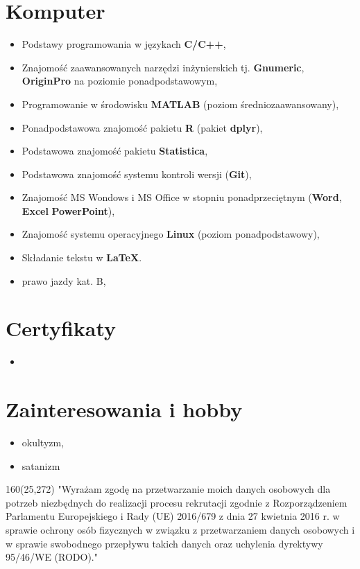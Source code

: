 \documentclass[10pt, a4paper, sans]{moderncv}   %
\begin{document}

\section{Komputer}
{\begin{itemize}
	\item Podstawy programowania w językach \textbf{C/C++}, 
	\item Znajomość zaawansowanych narzędzi inżynierskich tj. \textbf{Gnumeric}, \textbf{OriginPro} na poziomie ponadpodstawowym,
	\item Programowanie w środowisku \textbf{MATLAB} (poziom średniozaawansowany),
    \item Ponadpodstawowa znajomość pakietu \textbf{R} (pakiet \textbf{dplyr}),
    \item Podstawowa znajomość pakietu \textbf{Statistica},
    \item Podstawowa znajomość systemu kontroli wersji (\textbf{Git}),
	\item Znajomość MS Wondows i MS Office w stopniu ponadprzeciętnym (\textbf{Word}, \textbf{Excel} \textbf{PowerPoint}),
	\item Znajomość systemu operacyjnego \textbf{Linux} (poziom ponadpodstawowy),
	\item Składanie tekstu w \textbf{\LaTeX}.
	\item prawo jazdy kat. B,
\end{itemize}}

\section{Certyfikaty}
{\begin{itemize}
 \item
\end{itemize}}


\section{Zainteresowania i hobby}
{\begin{itemize}
\item okultyzm,
\item satanizm

\end{itemize}}

\begin{textblock}{160}(25,272)
\noindent "Wyrażam zgodę na przetwarzanie moich danych osobowych dla potrzeb niezbędnych do realizacji procesu rekrutacji zgodnie z Rozporządzeniem Parlamentu Europejskiego i Rady (UE) 2016/679 z dnia 27 kwietnia 2016 r. w sprawie ochrony osób fizycznych w związku z przetwarzaniem danych osobowych i w sprawie swobodnego przepływu takich danych oraz uchylenia dyrektywy 95/46/WE (RODO)."

\end{textblock}
\end{document}
